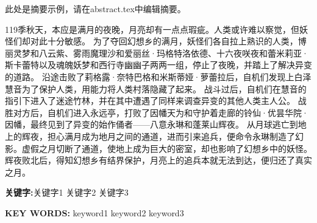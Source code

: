 \begin{cnabstract}
    \vspace{12pt}
    此处是摘要示例，请在abstract.tex中编辑摘要。

    119季秋天，本应是满月的夜晚，月亮却有一点点瑕疵。人类或许难以察觉，但妖怪们却对此十分敏感。
    为了夺回幻想乡的满月，妖怪们各自拉上熟识的人类，博丽灵梦和八云紫、雾雨魔理沙和爱丽丝·玛格特洛依德、十六夜咲夜和蕾米莉亚·斯卡蕾特以及魂魄妖梦和西行寺幽幽子两两一组，停止了夜晚，并踏上了解决异变的道路。
    沿途击败了莉格露·奈特巴格和米斯蒂娅·萝蕾拉后，自机们发现上白泽慧音为了保护人类，用能力将人类村落隐藏了起来。
    战斗过后，自机们在慧音的指引下进入了迷途竹林，并在其中遭遇了同样来调查异变的其他人类主人公。
    战胜对方后，自机们进入永远亭，打败了因幡天为和守护着走廊的铃仙·优昙华院·因幡，最终见到了异变的始作俑者——八意永琳和蓬莱山辉夜。
    从月球逃亡到地上的辉夜，担心满月成为地月之间的通道，进而引来追兵，便命令永琳制造了幻影。虚假之月切断了通道，使地上成为巨大的密室，却也影响了幻想乡中的妖怪。
    辉夜败北后，得知幻想乡有结界保护，月亮上的追兵本就无法到达，便归还了真实之月。
    \par\textbf{关键字:}关键字1 \qquad 关键字2 \qquad 关键字3
\end{cnabstract}
\vspace{12pt}
\setmainfont{Times New Roman}
\begin{enabstract}
        \vspace{12pt}
        \lipsum[1]
        \par\textbf{KEY WORDS:} keyword1 \qquad keyword2 \qquad keyword3
\end{enabstract}
\setmainfont[AutoFakeBold = {2.17}]{宋体}  %


